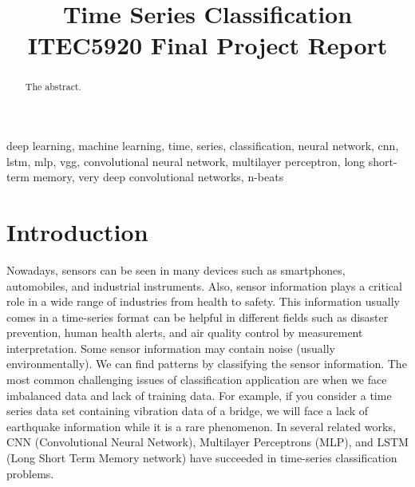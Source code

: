 \documentclass[conference]{IEEEtran}
\begin{document}
\title{Time Series Classification \\ ITEC5920 Final Project Report}

\author{
\and
{}

}

\maketitle

\begin{abstract}
The abstract.
\end{abstract}

\begin{IEEEkeywords}
deep learning, machine learning, time, series, classification, neural network, cnn, lstm, mlp, vgg, convolutional neural network, multilayer perceptron, long short-term memory, very deep convolutional networks, n-beats
\end{IEEEkeywords}

\section{Introduction}
Nowadays, sensors can be seen in many devices such as smartphones, automobiles, and industrial instruments. Also, sensor information plays a critical role in a wide range of industries from health to safety. This information usually comes in a time-series format can be helpful in different fields such as disaster prevention, human health alerts, and air quality control by measurement interpretation. Some sensor information may contain noise (usually environmentally). We can find patterns by classifying the sensor information. The most common challenging issues of classification application are when we face imbalanced data and lack of training data. For example, if you consider a time series data set containing vibration data of a bridge, we will face a lack of earthquake information while it is a rare phenomenon. In several related works, CNN (Convolutional Neural Network), Multilayer Perceptrons (MLP), and LSTM (Long Short Term Memory network) have succeeded in time-series classification problems.
\end{document}
